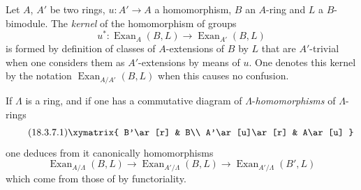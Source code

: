 \begin{env}[18.3.7]
\label{0.18.3.7}
Let $A$, $A'$ be two rings, $u:A'\to A$ a homomorphism, $B$ an $A$-ring and $L$ a $B$-bimodule.
The \emph{kernel} of the homomorphism of groups
\[
  u^*:\operatorname{Exan}_A(B,L)\to\operatorname{Exan}_{A'}(B,L)
\]
is formed by definition of classes of $A$-extensions of $B$ by $L$ that are $A'$-trivial when one considers them as $A'$-extensions by means of $u$.
One denotes this kernel by the notation $\operatorname{Exan}_{A/A'}(B,L)$ when this causes no confusion.

If $\Lambda$ is a ring, and if one has a commutative diagram of $\Lambda$-\emph{homomorphisms} of $\Lambda$-rings
\begin{equation}
\tag{18.3.7.1}
  \label{0.18.3.7.1}
  \xymatrix{
    B'\ar[r] & B\\
    A'\ar[u]\ar[r] & A\ar[u]
  }
\end{equation}
one deduces from it canonically homomorphisms
\begin{equation}
\tag{18.3.7.2}
  \label{0.18.3.7.2}
  \operatorname{Exan}_{A/\Lambda}(B,L)\to\operatorname{Exan}_{A'/\Lambda}(B,L)\to\operatorname{Exan}_{A'/\Lambda}(B',L)
\end{equation}
which come from those of  by functoriality.
\end{env}

